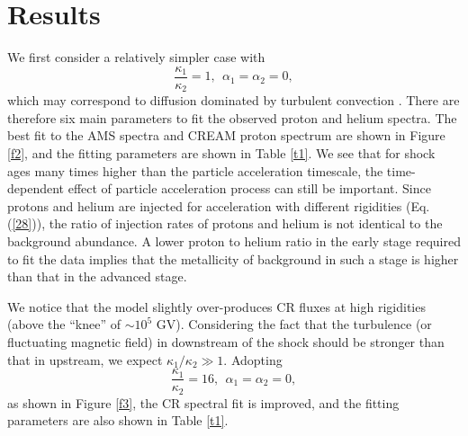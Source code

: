 \documentclass[apj]{emulateapj}
\begin{document}
\section{Results}\label{sec3}
We first consider a relatively simpler case with
\begin{equation}
\frac{\kappa _1}{\kappa _2}=1,\ \ \alpha _1=\alpha _2=0,\label{31}
\end{equation}
which may correspond to diffusion dominated by turbulent convection \citep{1993PhyU...36.1020B}. There are therefore six main parameters to fit the observed proton and helium spectra. The best fit to the AMS spectra and CREAM proton spectrum are shown in Figure \ref{f2}, and the fitting parameters are shown in Table \ref{t1}. We see that for shock ages many times higher than the particle acceleration timescale, the time-dependent effect of particle acceleration process can still be important. Since protons and helium are injected for acceleration with different rigidities (Eq. (\ref{28})), the ratio of injection rates of protons and helium is not identical to the background abundance. A lower proton to helium ratio in the early stage required to fit the data implies that the metallicity of background in such a stage is higher than that in the advanced stage.

We notice that the model slightly over-produces CR fluxes at high rigidities (above the ``knee'' of $\sim 10^5$ GV). Considering the fact that the turbulence (or fluctuating magnetic field) in downstream of the shock should be stronger than that in upstream, we expect $ \kappa_1/\kappa_2\gg 1 $. Adopting \citep[for this case there is an analytic solution, see][]{1991MNRAS.251..340D}
\begin{equation}
\frac{\kappa _1}{\kappa _2}=16,\ \ \alpha _1=\alpha _2=0,\label{35}
\end{equation}
as shown in Figure \ref{f3}, the CR spectral fit is improved, and the fitting parameters are also shown in Table \ref{t1}.
\end{document}
